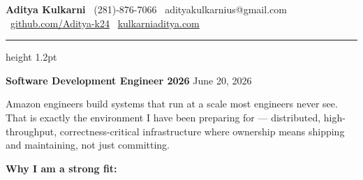 \documentclass[11pt,letterpaper]{article}
\begin{document}
\thispagestyle{empty}

{\large \textbf{Aditya Kulkarni}} \hfill
{\color{AmazonOrange} \faPhone\ (281)-876-7066} \quad
{\color{AmazonOrange} \faEnvelope\ adityakulkarnius@gmail.com} \\
{\color{AmazonOrange} \faGithub\ \href{https://github.com/Aditya-k24}{github.com/Aditya-k24}} \quad
{\color{AmazonOrange} \faGlobe\ \href{https://www.kulkarniaditya.com}{kulkarniaditya.com}}

\vspace{6pt}
{\color{AmazonOrange}\hrule height 1.2pt}
\vspace{12pt}

{\color{AmazonOrange} \textbf{Software Development Engineer 2026}} \hfill June 20, 2026

\vspace{10pt}

Amazon engineers build systems that run at a scale most engineers never see. That is exactly the environment I have been preparing for --- distributed, high-throughput, correctness-critical infrastructure where ownership means shipping and maintaining, not just committing.

\vspace{6pt}

\textbf{Why I am a strong fit:}
\end{document}
